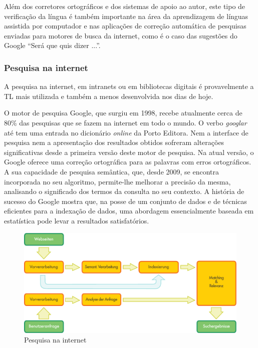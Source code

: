 \documentclass[]{../metanetpaper}
\begin{document}
\begin{multicols}{2}
Além dos corretores ortográficos e dos sistemas de apoio ao autor, este tipo de verificação da língua é também importante na área da aprendizagem de línguas assistida por computador e nas aplicações de correção automática de pesquisas enviadas para motores de busca da internet, como é o caso das sugestões do Google “Será que quis dizer ...”.

\subsubsection{Pesquisa na internet}

 A pesquisa na internet, em intranets ou em bibliotecas digitais é provavelmente a TL mais utilizada e também a menos desenvolvida nos dias de hoje.

O motor de pesquisa Google, que surgiu em 1998, recebe atualmente cerca de 80\% das pesquisas que se fazem na internet em todo o mundo\cite{spi1}. O verbo \textit{googlar} até tem uma entrada no dicionário \textit{online} da Porto Editora. Nem a interface de pesquisa nem a apresentação dos resultados obtidos sofreram alterações significativas desde a primeira versão deste motor de pesquisa. Na atual versão, o Google o\-fe\-re\-ce uma correção ortográfica para as palavras com erros ortográficos. A sua capacidade de pesquisa semântica, que, desde 2009, se encontra incorporada no seu algoritmo, permite-lhe melhorar a precisão da mesma, analisando o significado dos termos da consulta no seu contexto\cite{pc1}. A história de sucesso do Google mostra que, na posse de um conjunto de dados e de técnicas eficientes para a indexação de dados, uma abordagem essencialmente baseada em estatística pode levar a resultados satisfatórios.

\begin{figure}[htb]
  \center
  \includegraphics[width=\textwidth]{../_media/german/web_search_architecture}
  \caption{Pesquisa na internet}
  \label{fig:websearcharch_de}
\end{figure}


\end{multicols}
\end{document}
